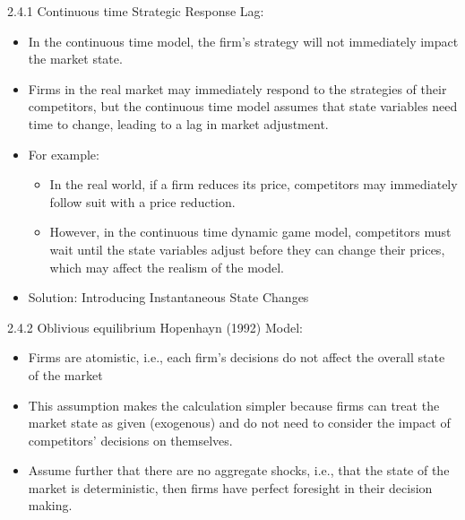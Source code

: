 \documentclass[aspectratio=169]{beamer}  %
\begin{document}
\begin{frame}
{2.4.1 Continuous time}
Strategic Response Lag:
\begin{itemize}
    \item In the continuous time model, the firm's strategy will not immediately impact the market state.
    \item Firms in the real market may immediately respond to the strategies of their competitors, but the continuous time model assumes that state variables need time to change, leading to a lag in market adjustment.
    \item For example:
    \begin{itemize}
        \item In the real world, if a firm reduces its price, competitors may immediately follow suit with a price reduction.
        \item However, in the continuous time dynamic game model, competitors must wait until the state variables adjust before they can change their prices, which may affect the realism of the model.
    \end{itemize}
    \item Solution: Introducing Instantaneous State Changes
\end{itemize}


\end{frame}

\begin{frame}{2.4.2 Oblivious equilibrium}
Hopenhayn (1992) Model:
\begin{itemize}
    \item Firms are atomistic, i.e., each firm's decisions do not affect the overall state of the market 
    \item This assumption makes the calculation simpler because firms can treat the market state as given (exogenous) and do not need to consider the impact of competitors' decisions on themselves.

    \item Assume further that there are no aggregate shocks, i.e., that the state of the market is deterministic, then firms have perfect foresight in their decision making.
\end{itemize}

 
\end{frame}
\end{document}
